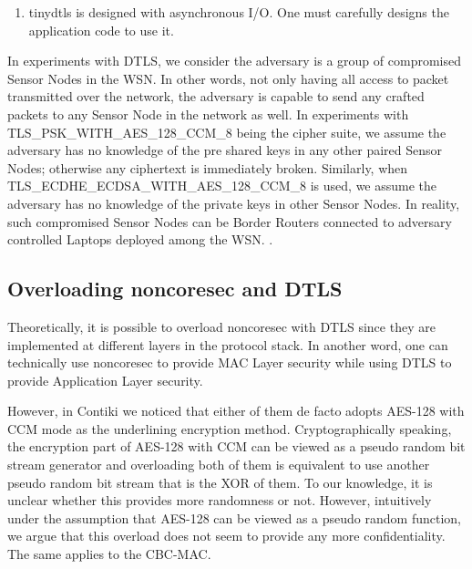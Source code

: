 \begin{enumerate}
\item tinydtls is designed with asynchronous I/O. One must carefully designs the application code to use it.
\end{enumerate}

In experiments with DTLS, we consider the adversary is a group of compromised Sensor Nodes in the WSN. In other words, not only having all access to packet transmitted over the network, the adversary is capable to send any crafted packets to any Sensor Node in the network as well. In experiments with TLS\_PSK\_WITH\_AES\_128\_CCM\_8 being the cipher suite, we assume the adversary has no knowledge of the pre shared keys in any other paired Sensor Nodes; otherwise any ciphertext is immediately broken. Similarly, when TLS\_ECDHE\_ECDSA\_WITH\_AES\_128\_CCM\_8 is used, we assume the adversary has no knowledge of the private keys in other Sensor Nodes. In reality, such compromised Sensor Nodes can be Border Routers connected to adversary controlled Laptops deployed among the WSN. .

\subsection{Overloading noncoresec and DTLS}

Theoretically, it is possible to overload noncoresec with DTLS since they are implemented at different layers in the protocol stack. In another word, one can technically use noncoresec to provide MAC Layer security while using DTLS to provide Application Layer security.

However, in Contiki we noticed that either of them de facto adopts AES-128 with CCM mode as the underlining encryption method. Cryptographically speaking, the encryption part of AES-128 with CCM can be viewed as a pseudo random bit stream generator and overloading both of them is equivalent to use another pseudo random bit stream that is the XOR of them. To our knowledge, it is unclear whether this provides more randomness or not. However, intuitively under the assumption that AES-128 can be viewed as a pseudo random function, we argue that this overload does not seem to provide any more confidentiality. The same applies to the CBC-MAC.


